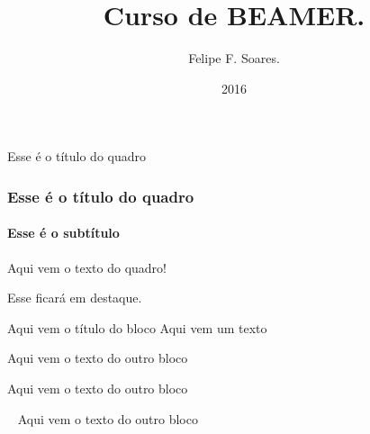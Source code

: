 \documentclass{beamer}
\title{Curso de BEAMER.}
\author[Felipe]{Felipe F. Soares.}
\institute[UFC]{Universidade Federal do Ceará \\ ufc.br}
\date{2016}
\begin{document}
	\begin{frame}{Esse é o título do quadro}
		\titlepage
	\end{frame}
	
	\begin{frame}
		\frametitle{Esse é o título do quadro}
		\framesubtitle{Esse é o subtítulo}
		Aqui vem o texto do quadro!
		
		\alert{Esse ficará em destaque.} \pause
		\begin{block}{Aqui vem o título do bloco}
			Aqui vem um texto
		\end{block}
		\begin{block}
			Aqui vem o texto do outro bloco
		\end{block}
		\begin{block}{}
			Aqui vem o texto do outro bloco
		\end{block}
		\begin{block}{\ }
			Aqui vem o texto do outro bloco
		\end{block}
	\end{frame}
\end{document}

